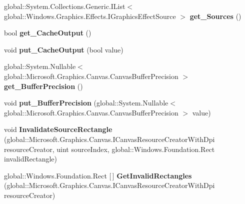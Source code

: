 \begin{DoxyCompactItemize}
global\+::\+System.\+Collections.\+Generic.\+I\+List$<$ global\+::\+Windows.\+Graphics.\+Effects.\+I\+Graphics\+Effect\+Source $>$ {\bfseries get\+\_\+\+Sources} ()
\item 
\mbox{\label{class_microsoft_1_1_graphics_1_1_canvas_1_1_effects_1_1_composite_effect_a3c66fe91b91cc425331cdcb4f41beba8}} 
bool {\bfseries get\+\_\+\+Cache\+Output} ()
\item 
\mbox{\label{class_microsoft_1_1_graphics_1_1_canvas_1_1_effects_1_1_composite_effect_a39920fed4de684b9667e7d93c63dbb0c}} 
void {\bfseries put\+\_\+\+Cache\+Output} (bool value)
\item 
\mbox{\label{class_microsoft_1_1_graphics_1_1_canvas_1_1_effects_1_1_composite_effect_ac433461e33a3e94122754d4e470ae2a8}} 
global\+::\+System.\+Nullable$<$ global\+::\+Microsoft.\+Graphics.\+Canvas.\+Canvas\+Buffer\+Precision $>$ {\bfseries get\+\_\+\+Buffer\+Precision} ()
\item 
\mbox{\label{class_microsoft_1_1_graphics_1_1_canvas_1_1_effects_1_1_composite_effect_ad0b7d7f2cc2acbb85fe495fed77f265d}} 
void {\bfseries put\+\_\+\+Buffer\+Precision} (global\+::\+System.\+Nullable$<$ global\+::\+Microsoft.\+Graphics.\+Canvas.\+Canvas\+Buffer\+Precision $>$ value)
\item 
\mbox{\label{class_microsoft_1_1_graphics_1_1_canvas_1_1_effects_1_1_composite_effect_a8a4fb8c17ba9742bfb35ffb0d19554c6}} 
void {\bfseries Invalidate\+Source\+Rectangle} (global\+::\+Microsoft.\+Graphics.\+Canvas.\+I\+Canvas\+Resource\+Creator\+With\+Dpi resource\+Creator, uint source\+Index, global\+::\+Windows.\+Foundation.\+Rect invalid\+Rectangle)
\item 
\mbox{\label{class_microsoft_1_1_graphics_1_1_canvas_1_1_effects_1_1_composite_effect_aeffe7eebfeace24db9ecf9de735d7a0b}} 
global\+::\+Windows.\+Foundation.\+Rect \mbox{[}$\,$\mbox{]} {\bfseries Get\+Invalid\+Rectangles} (global\+::\+Microsoft.\+Graphics.\+Canvas.\+I\+Canvas\+Resource\+Creator\+With\+Dpi resource\+Creator)

\end{DoxyCompactItemize}
